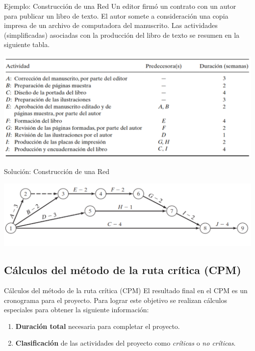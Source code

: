 \documentclass{beamer}
\begin{document}
\begin{frame}{Ejemplo: Construcción de una Red}
    Un editor firmó un contrato con un autor para publicar un libro de texto. El autor somete a consideración una copia impresa de un archivo de computadora del manuscrito. Las actividades (simplificadas) asociadas con la producción del libro de texto se resumen en la siguiente tabla.
    \begin{center}
        \includegraphics[scale=0.3]{images/08_ejemplo_2.png}
    \end{center}
\end{frame}

\begin{frame}{Solución: Construcción de una Red}
   \begin{center}
       \includegraphics[width=\linewidth]{images/08_sol_ejemplo_2.png}
   \end{center} 
\end{frame}

\subsection{Cálculos del método de la ruta crítica (CPM)}
\begin{frame}{Cálculos del método de la ruta crítica (CPM)}
    El resultado final en el CPM es un cronograma para el proyecto. 
    Para lograr este objetivo se realizan cálculos especiales para obtener la siguiente información:
    
    \begin{enumerate}
        \item \textbf{Duración total} necesaria para completar el proyecto.
        \item \textbf{Clasificación} de las actividades del proyecto como \textit{críticas} o \textit{no críticas}.
    \end{enumerate}
\end{frame}
\end{document}
